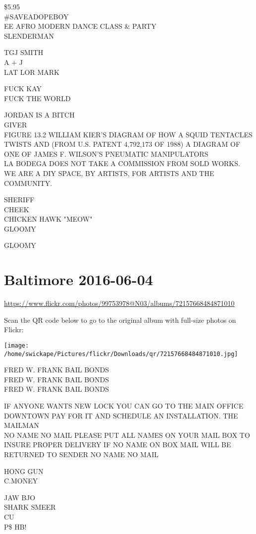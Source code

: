 \documentclass[10pt,letterpaper]{article}
\begin{document}
\$5.95\\
\#SAVEADOPEBOY\\
EE AFRO MODERN DANCE CLASS \& PARTY\\
SLENDERMAN

TGJ SMITH\\
A + J\\
LAT LOR MARK

FUCK KAY\\
FUCK THE WORLD

JORDAN IS A BITCH\\
GIVER\\
FIGURE 13.2 WILLIAM KIER'S DIAGRAM OF HOW A SQUID TENTACLES TWISTS AND (FROM U.S. PATENT 4,792,173 OF 1988) A DIAGRAM OF ONE OF JAMES F. WILSON'S PNEUMATIC MANIPULATORS\\
LA BODEGA DOES NOT TAKE A COMMISSION FROM SOLD WORKS.  WE ARE A DIY SPACE, BY ARTISTS, FOR ARTISTS AND THE COMMUNITY.

SHERIFF\\
CHEEK\\
CHICKEN HAWK "MEOW"\\
GLOOMY

GLOOMY
\pagebreak

\section*{Baltimore 2016-06-04}

\url{https://www.flickr.com/photos/99753978@N03/albums/72157668484871010}

Scan the QR code below to go to the original album with full-size photos on Flickr:

\texttt{[image: /home/swickape/Pictures/flickr/Downloads/qr/72157668484871010.jpg]}
\pagebreak

FRED W. FRANK BAIL BONDS\\
FRED W. FRANK BAIL BONDS\\
FRED W. FRANK BAIL BONDS

IF ANYONE WANTS NEW LOCK YOU CAN GO TO THE MAIN OFFICE DOWNTOWN PAY FOR IT AND SCHEDULE AN INSTALLATION. THE MAILMAN\\
NO NAME NO MAIL PLEASE PUT ALL NAMES ON YOUR MAIL BOX TO INSURE PROPER DELIVERY IF NO NAME ON BOX MAIL WILL BE RETURNED TO SENDER NO NAME NO MAIL

HONG GUN\\
C.MONEY

JAW BJO\\
SHARK SMEER\\
CU\\
P\$ HB!
\end{document}
